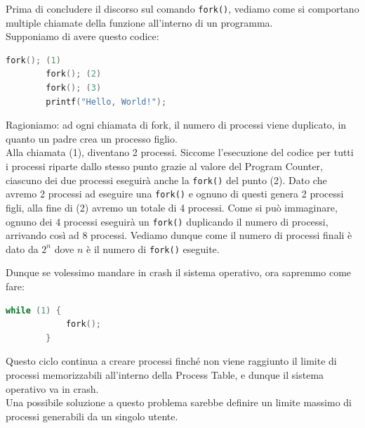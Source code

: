\documentclass[12pt]{report}
\begin{document}
	Prima di concludere il discorso sul comando \texttt{fork()}, vediamo come si comportano multiple chiamate della funzione all'interno di un programma.\\
	Supponiamo di avere questo codice:
	\begin{lstlisting}[language=C]
		fork(); (1)
		fork(); (2)
		fork(); (3)
		printf("Hello, World!");
	\end{lstlisting}
	Ragioniamo: ad ogni chiamata di fork, il numero di processi viene duplicato, in quanto un padre crea un processo figlio.\\
	Alla chiamata (1), diventano 2 processi. Siccome l'esecuzione del codice per tutti i processi riparte dallo stesso punto grazie al valore del Program Counter, ciascuno dei due processi eseguirà anche la \texttt{fork()} del punto (2). Dato che avremo 2 processi ad eseguire una \texttt{fork()} e ognuno di questi genera 2 processi figli, alla fine di (2) avremo un totale di 4 processi. Come si può immaginare, ognuno dei 4 processi eseguirà un \texttt{fork()} duplicando il numero di processi, arrivando così ad 8 processi.	Vediamo dunque come il numero di processi finali è dato da $2^n$ dove $n$ è il numero di \texttt{fork()} eseguite.
	
	Dunque se volessimo mandare in crash il sistema operativo, ora sapremmo come fare:
	\begin{lstlisting}[language=C, caption={Codice per implementare la cosiddetta "fork bomb".}]
		while (1) {
			fork();
		}
	\end{lstlisting}
	Questo ciclo continua a creare processi finché non viene raggiunto il limite di processi memorizzabili all'interno della Process Table, e dunque il sistema operativo va in crash.\\
	Una possibile soluzione a questo problema sarebbe definire un limite massimo di processi generabili da un singolo utente.
	
\end{document}
